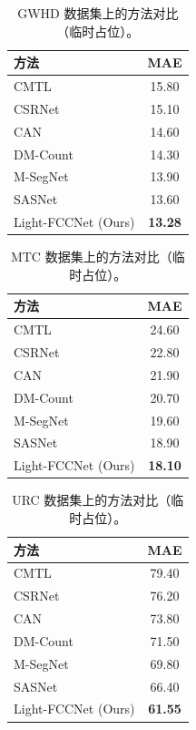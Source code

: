 \documentclass[a4paper,fleqn]{cas-sc}
\newcommand{\tablesize}{\small}
\begin{document}
\begin{table}[!htbp]
    \centering
    \caption{GWHD 数据集上的方法对比（临时占位）。}
    \label{tab:gwhd_placeholder}
    \tablesize
    \setlength{\tabcolsep}{8pt}
    \begin{tabular}{@{}lc@{}}
        \toprule
        方法 & MAE \\
        \midrule
        CMTL                & 15.80 \\
        CSRNet              & 15.10 \\
        CAN                 & 14.60 \\
        DM-Count            & 14.30 \\
        M-SegNet            & 13.90 \\
        SASNet              & 13.60 \\
        Light-FCCNet (Ours) & \textbf{13.28} \\
        \bottomrule
    \end{tabular}
\end{table}

\begin{table}[!htbp]
    \centering
    \caption{MTC 数据集上的方法对比（临时占位）。}
    \label{tab:mtc_placeholder}
    \tablesize
    \setlength{\tabcolsep}{8pt}
    \begin{tabular}{@{}lc@{}}
        \toprule
        方法 & MAE \\
        \midrule
        CMTL                & 24.60 \\
        CSRNet              & 22.80 \\
        CAN                 & 21.90 \\
        DM-Count            & 20.70 \\
        M-SegNet            & 19.60 \\
        SASNet              & 18.90 \\
        Light-FCCNet (Ours) & \textbf{18.10} \\
        \bottomrule
    \end{tabular}
\end{table}

\begin{table}[!htbp]
    \centering
    \caption{URC 数据集上的方法对比（临时占位）。}
    \label{tab:urc_placeholder}
    \tablesize
    \setlength{\tabcolsep}{8pt}
    \begin{tabular}{@{}lc@{}}
        \toprule
        方法 & MAE \\
        \midrule
        CMTL                & 79.40 \\
        CSRNet              & 76.20 \\
        CAN                 & 73.80 \\
        DM-Count            & 71.50 \\
        M-SegNet            & 69.80 \\
        SASNet              & 66.40 \\
        Light-FCCNet (Ours) & \textbf{61.55} \\
        \bottomrule
    \end{tabular}
\end{table}
\end{document}
